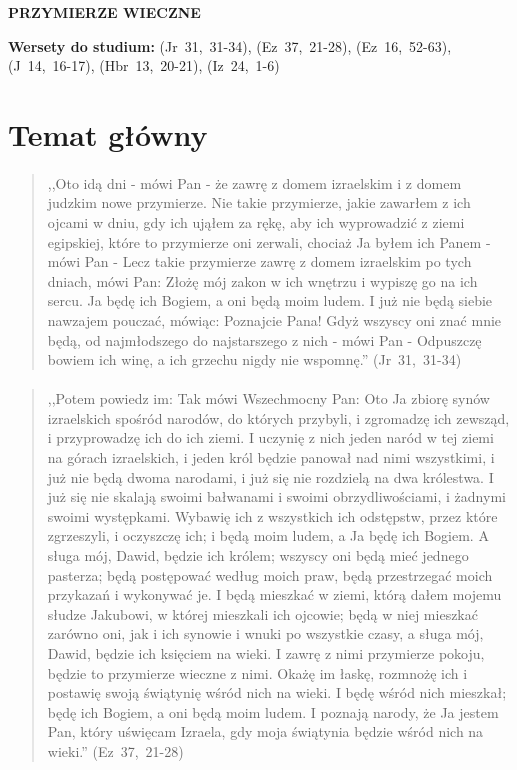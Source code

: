 \documentclass[10pt,a4paper,oneside]{article}
\begin{document}
\centerline{\textbf{\MakeUppercase{Przymierze wieczne}}}
\begin{center}
\textbf{Wersety do studium:} \mbox{(Jr 31, 31-34)}, \mbox{(Ez 37, 21-28)}, \mbox{(Ez 16, 52-63)}, \mbox{(J 14, 16-17)}, \mbox{(Hbr 13, 20-21)}, \mbox{(Iz 24, 1-6)}
\end{center}
\section{Temat główny}
\paragraph{}
\begin{quote}
,,Oto idą dni - mówi Pan - że zawrę z domem izraelskim i z domem judzkim nowe przymierze. Nie takie przymierze, jakie zawarłem z ich ojcami w dniu, gdy ich ująłem za rękę, aby ich wyprowadzić z ziemi egipskiej, które to przymierze oni zerwali, chociaż Ja byłem ich Panem - mówi Pan - Lecz takie przymierze zawrę z domem izraelskim po tych dniach, mówi Pan: Złożę mój zakon w ich wnętrzu i wypiszę go na ich sercu. Ja będę ich Bogiem, a oni będą moim ludem. I już nie będą siebie nawzajem pouczać, mówiąc: Poznajcie Pana! Gdyż wszyscy oni znać mnie będą, od najmłodszego do najstarszego z nich - mówi Pan - Odpuszczę bowiem ich winę, a ich grzechu nigdy nie wspomnę.'' \mbox{(Jr 31, 31-34)}
\end{quote}
\paragraph{}
\begin{quote}
,,Potem powiedz im: Tak mówi Wszechmocny Pan: Oto Ja zbiorę synów izraelskich spośród narodów, do których przybyli, i zgromadzę ich zewsząd, i przyprowadzę ich do ich ziemi. I uczynię z nich jeden naród w tej ziemi na górach izraelskich, i jeden król będzie panował nad nimi wszystkimi, i już nie będą dwoma narodami, i już się nie rozdzielą na dwa królestwa. I już się nie skalają swoimi bałwanami i swoimi obrzydliwościami, i żadnymi swoimi występkami. Wybawię ich z wszystkich ich odstępstw, przez które zgrzeszyli, i oczyszczę ich; i będą moim ludem, a Ja będę ich Bogiem. A sługa mój, Dawid, będzie ich królem; wszyscy oni będą mieć jednego pasterza; będą postępować według moich praw, będą przestrzegać moich przykazań i wykonywać je. I będą mieszkać w ziemi, którą dałem mojemu słudze Jakubowi, w której mieszkali ich ojcowie; będą w niej mieszkać zarówno oni, jak i ich synowie i wnuki po wszystkie czasy, a sługa mój, Dawid, będzie ich księciem na wieki. I zawrę z nimi przymierze pokoju, będzie to przymierze wieczne z nimi. Okażę im łaskę, rozmnożę ich i postawię swoją świątynię wśród nich na wieki. I będę wśród nich mieszkał; będę ich Bogiem, a oni będą moim ludem. I poznają narody, że Ja jestem Pan, który uświęcam Izraela, gdy moja świątynia będzie wśród nich na wieki.'' \mbox{(Ez 37, 21-28)}
\end{quote}
\end{document}
